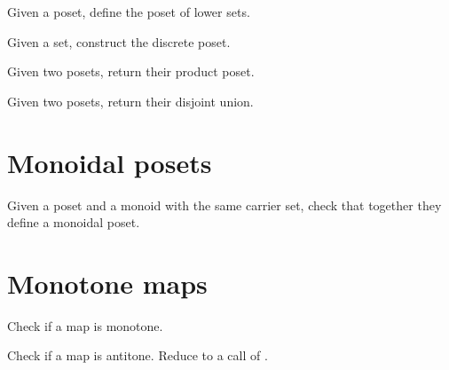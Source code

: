 \begin{gradedexercise}
Given a poset, define the poset of lower sets.
\end{gradedexercise}


\begin{gradedexercise}
Given a set, construct the discrete poset.

\end{gradedexercise}


\begin{gradedexercise}
Given two posets, return their product poset.
\end{gradedexercise}
\begin{gradedexercise}
Given two posets, return their disjoint union.

\end{gradedexercise}


\section{Monoidal posets}



\begin{gradedexercise}
Given a poset and a monoid with the same carrier set, check that together they define a monoidal poset.

\end{gradedexercise}


\section{Monotone maps}




\begin{gradedexercise}
Check if a map is monotone.

\end{gradedexercise}


\begin{gradedexercise}
Check if a map is antitone. Reduce to a call of .

\end{gradedexercise}



